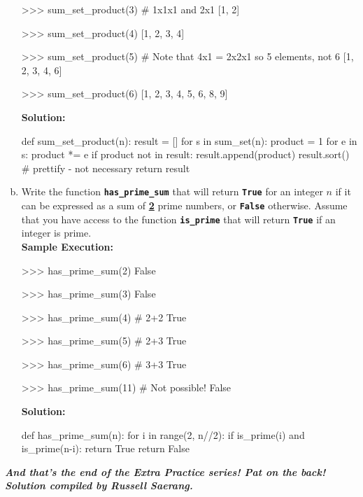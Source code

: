 \begin{enumerate}[(a)]
\begin{python}
>>> sum_set_product(3) # 1x1x1 and 2x1
[1, 2]

>>> sum_set_product(4)
[1, 2, 3, 4]

>>> sum_set_product(5) # Note that 4x1 = 2x2x1 so 5 elements, not 6
[1, 2, 3, 4, 6]

>>> sum_set_product(6)
[1, 2, 3, 4, 5, 6, 8, 9]
\end{python}
\textbf{Solution:}
\begin{python}
def sum_set_product(n):
    result = []
    for s in sum_set(n):
        product = 1
        for e in s:
            product *= e
        if product not in result:
            result.append(product)
    result.sort() # prettify - not necessary
    return result
\end{python}

\item Write the function \texttt{\bfseries has\_prime\_sum} that will return \texttt{\bfseries True} for an 
integer $n$ if it can be expressed as a sum of \textbf{\underline{2}} prime numbers, or \texttt{\bfseries False} 
otherwise. Assume that you have access to the function \texttt{\bfseries is\_prime} that will return 
\texttt{\bfseries True} if an integer is prime. \\
\textbf{Sample Execution:}
\begin{python}
>>> has_prime_sum(2)
False

>>> has_prime_sum(3)
False

>>> has_prime_sum(4)    # 2+2
True

>>> has_prime_sum(5)    # 2+3
True

>>> has_prime_sum(6)    # 3+3
True

>>> has_prime_sum(11)   # Not possible!
False
\end{python}
\textbf{Solution:}
\begin{python}
def has_prime_sum(n):
    for i in range(2, n//2):
        if is_prime(i) and is_prime(n-i):
            return True
    return False
\end{python}
\end{enumerate}

\begin{flushright}
\textbf{\textit{And that's the end of the Extra Practice series! Pat on the back! \\
Solution compiled by Russell Saerang.}}
\end{flushright}
